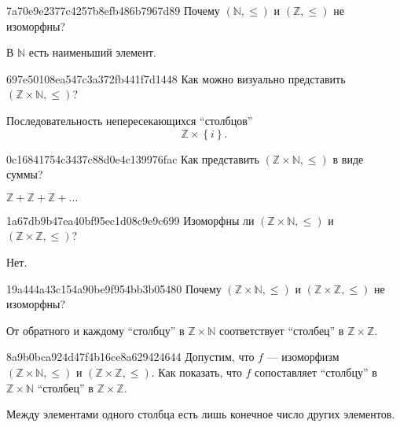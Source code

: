 \begin{note}{7a70e9e2377c4257b8efb486b7967d89}
    Почему \({ (\mathbb N, \leqslant) }\) и \({ (\mathbb Z, \leqslant) }\) не изоморфны?

    \begin{cloze}{1}
        В \({ \mathbb N }\) есть наименьший элемент.
    \end{cloze}
\end{note}

\begin{note}{697e50108ea547c3a372fb441f7d1448}
    Как можно визуально представить \({ (\mathbb Z \times \mathbb N, \leqslant) }\)?

    \begin{cloze}{1}
        Последовательность непересекающихся ``столбцов''
        \[
            \mathbb Z \times \left\{ i \right\}.
        \]
    \end{cloze}
\end{note}

\begin{note}{0c16841754c3437c88d0e4c139976fac}
    Как представить \({ (\mathbb Z \times \mathbb N, \leqslant) }\) в виде суммы?

    \begin{cloze}{1}
        \({ \mathbb Z + \mathbb Z + \mathbb Z + \ldots }\)
    \end{cloze}
\end{note}

\begin{note}{1a67db9b47ea40bf95ec1d08c9e9c699}
    Изоморфны ли \({ (\mathbb Z \times \mathbb N, \leqslant) }\) и \({ (\mathbb Z \times \mathbb Z, \leqslant) }\)?

    \begin{cloze}{1}
        Нет.
    \end{cloze}
\end{note}

\begin{note}{19a444a43c154a90be9f954bb3b05480}
    Почему \({ (\mathbb Z \times \mathbb N, \leqslant) }\) и \({ (\mathbb Z \times \mathbb Z, \leqslant) }\) не изоморфны?

    \begin{cloze}{1}
        От обратного и каждому ``столбцу'' в \({ \mathbb Z \times \mathbb N }\) соответствует ``столбец'' в \({ \mathbb Z \times \mathbb Z }\).
    \end{cloze}
\end{note}

\begin{note}{8a9b0bca924d47f4b16ce8a629424644}
    Допустим, что \({ f }\) --- изоморфизм \({ (\mathbb Z \times \mathbb N, \leqslant) }\) и \({ (\mathbb Z \times \mathbb Z, \leqslant) }\).
    Как показать, что \({ f }\) сопоставляет ``столбцу'' в \({ \mathbb Z \times \mathbb N }\) ``столбец'' в \({ \mathbb Z \times \mathbb Z }\).

    \begin{cloze}{1}
        Между элементами одного столбца есть лишь конечное число других элементов.
    \end{cloze}
\end{note}

